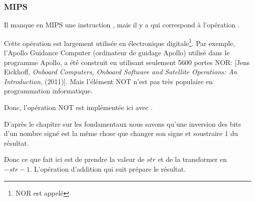﻿\subsubsection{MIPS}




Il manque en MIPS une instruction \NOT, mais il y a \NOR qui correspond à l'opération
.

Cette opération est largement utilisée en électronique digitale\footnote{NOR est
appelé }.
Par exemple, l'Apollo Guidance Computer (ordinateur de guidage Apollo) utilisé dans
le programme Apollo, a été construit en utilisant seulement 5600 portes NOR:
[Jens Eickhoff, \emph{Onboard Computers, Onboard Software and Satellite Operations: An Introduction}, (2011)].
Mais l'élément NOT n'est pas très populaire en programmation informatique.

Donc, l'opération NOT est implémentée ici avec .

D'après le chapitre sur les fondamentaux nous savons qu'une
inversion des bits d'un nombre signé est la même chose que changer son signe et soustraire
1 du résultat.

Donc ce que \NOT fait ici est de prendre la valeur de $str$ et de la transformer
en $-str-1$.
L'opération d'addition qui suit prépare le résultat.
